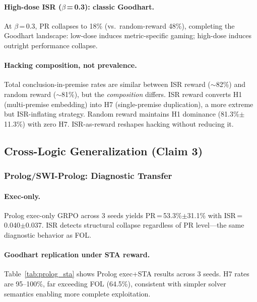 \documentclass[11pt,a4paper]{article}
\begin{document}
\paragraph{High-dose ISR ($\beta$\,=\,0.3): classic Goodhart.}
At $\beta$\,=\,0.3, PR collapses to 18\% (vs.\ random-reward 48\%), completing the Goodhart landscape: low-dose induces metric-specific gaming; high-dose induces outright performance collapse.

\paragraph{Hacking composition, not prevalence.}
Total conclusion-in-premise rates are similar between ISR reward ($\sim$82\%) and random reward ($\sim$81\%), but the \emph{composition} differs.
ISR reward converts H1 (multi-premise embedding) into H7 (single-premise duplication), a more extreme but ISR-inflating strategy.
Random reward maintains H1 dominance (81.3\%$\pm$11.3\%) with zero H7.
ISR-as-reward reshapes hacking without reducing it.

\subsection{Cross-Logic Generalization (Claim 3)}
\label{sec:claim3}

\subsubsection{Prolog/SWI-Prolog: Diagnostic Transfer}

\paragraph{Exec-only.}
Prolog exec-only GRPO across 3 seeds yields PR\,=\,53.3\%$\pm$31.1\% with ISR\,=\,0.040$\pm$0.037.
ISR detects structural collapse regardless of PR level---the same diagnostic behavior as FOL.

\paragraph{Goodhart replication under STA reward.}
Table~\ref{tab:prolog_sta} shows Prolog exec+STA results across 3 seeds.
H7 rates are 95--100\%, far exceeding FOL (64.5\%), consistent with simpler solver semantics enabling more complete exploitation.
\end{document}
